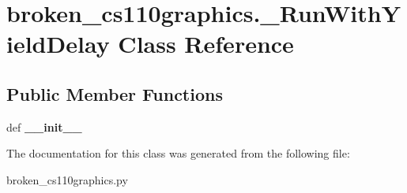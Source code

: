 \hypertarget{classbroken__cs110graphics_1_1__RunWithYieldDelay}{
\section{broken\_\-cs110graphics.\_\-RunWithYieldDelay Class Reference}
\label{classbroken__cs110graphics_1_1__RunWithYieldDelay}
}
\subsection*{Public Member Functions}
\begin{DoxyCompactItemize}
\item 
\hypertarget{classbroken__cs110graphics_1_1__RunWithYieldDelay_a222b49e884524483d5d6c8a8de52a4a6}{
def {\bfseries \_\-\_\-init\_\-\_\-}}
\label{classbroken__cs110graphics_1_1__RunWithYieldDelay_a222b49e884524483d5d6c8a8de52a4a6}

\end{DoxyCompactItemize}


The documentation for this class was generated from the following file:\begin{DoxyCompactItemize}
\item 
broken\_\-cs110graphics.py\end{DoxyCompactItemize}
